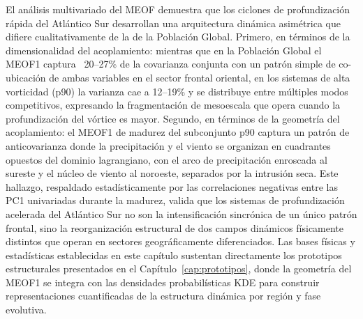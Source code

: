 El análisis multivariado del MEOF demuestra que los ciclones de profundización rápida del Atlántico Sur desarrollan una arquitectura dinámica asimétrica que difiere cualitativamente de la de la Población Global. 
Primero, en términos de la dimensionalidad del acoplamiento: mientras que en la Población Global el MEOF1 captura ~20--27\% de la covarianza conjunta con un patrón simple de co-ubicación de ambas variables en el sector frontal oriental, en los sistemas de alta vorticidad (p90) la varianza cae a 12--19\% y se distribuye entre múltiples modos competitivos, expresando la fragmentación de mesoescala que opera cuando la profundización del vórtice es mayor.
Segundo, en términos de la geometría del acoplamiento: el MEOF1 de madurez del subconjunto p90 captura un patrón de anticovarianza donde la precipitación y el viento se organizan en cuadrantes opuestos del dominio lagrangiano, con el arco de precipitación enroscada al sureste y el núcleo de viento al noroeste, separados por la intrusión seca.
Este hallazgo, respaldado estadísticamente por las correlaciones negativas entre las PC1 univariadas durante la madurez, valida que los sistemas de profundización acelerada del Atlántico Sur no son la intensificación sincrónica de un único patrón frontal, sino la reorganización estructural de dos campos dinámicos físicamente distintos que operan en sectores geográficamente diferenciados.
Las bases físicas y estadísticas establecidas en este capítulo sustentan directamente los prototipos estructurales presentados en el Capítulo~\ref{cap:prototipos}, donde la geometría del MEOF1 se integra con las densidades probabilísticas KDE para construir representaciones cuantificadas de la estructura dinámica por región y fase evolutiva.

